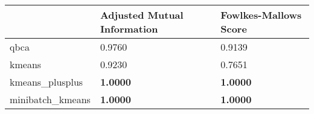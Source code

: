 \begin{table}[htbp]
\centering
\begin{tabular}{lll}
\toprule
 & Adjusted Mutual Information & Fowlkes-Mallows Score \\
\midrule
qbca & 0.9760 & 0.9139 \\
kmeans & 0.9230 & 0.7651 \\
kmeans_plusplus & \textbf{1.0000} & \textbf{1.0000} \\
minibatch_kmeans & \textbf{1.0000} & \textbf{1.0000} \\
\bottomrule
\end{tabular}
\end{table}
